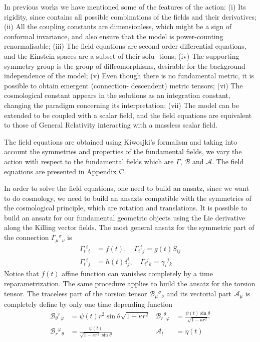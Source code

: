 \documentclass[10pt,a4paper]{article}
\begin{document}
In previous works we have mentioned some of the features of the action: (i) Its rigidity, since contains all possible combinations of the fields and their derivatives; 
(ii) All the coupling constants are dimensionless, which might be a sign of conformal invariance, and also ensure that the model is power-counting renormalisable; 
(iii) The field equations are second order differential equations, and the Einstein spaces are a subset of their solu- tions; 
(iv) The supporting symmetry group is the group of diffeomorphisms, desirable for the background independence of the model; 
(v) Even though there is no fundamental metric, it is possible to obtain emergent (connection- descendent) metric tensors; 
(vi) The cosmological constant appears in the solutions as an integration constant, changing the paradigm concerning its interpretation; 
(vii) The model can be extended to be coupled with a scalar field, and the field equations are equivalent to those of General Relativity interacting with a massless scalar field. 

The field equations are obtained using Kiwosjki’s formalism and taking into account the symmetries and properties of the fundamental fields, 
we vary the action with respect to the fundamental fields which are $\Gamma$, $\mathcal{B}$ and $\mathcal{A}$. The field equations are presented in Appendix C.

In order to solve the field equations, one need to build an ansatz, since we want to do cosmology, we need to build an ansazts
compatible with the symmetries of the cosmological principle, which are rotation and translations. It is possible to build an ansatz for our
fundamental geometric objects using the Lie derivative along the Killing vector fields. The most general ansatz for the symmetric part of the 
connection $\Gamma_{\mu}{}^{\sigma}{}_{\nu}$ is
\begin{align}
      \Gamma_{t}{}^{t}{ }_{t} & =f(t), \quad \Gamma_{i}{ }^{t}{ }_{j}=g(t) S_{i j} \\
      \Gamma_{t}{ }^{i}{ }_{j} &= h(t) \delta^{i}_{j}, \quad \Gamma_{i}{ }^{j}{ }_{k}= \gamma_{i}{ }^{j}{ }_{k}
\end{align}
Notice that $f(t)$ affine function can vanishes completely by a time reparametrization. The same procedure applies to build the ansatz for the torsion tensor. The traceless part of the torsion 
tensor $\mathcal{B}_{\mu}{}^{\sigma}{}_{\nu}$ and its vectorial part $\mathcal{A}_\mu$ is completely define by only one time depending function
\begin{align*}
    \mathcal{B}_{\theta}{ }^{r}{ }_{\varphi} & = \psi (t) r^2\sin\theta \sqrt{1 - \kappa r^2} &
    \mathcal{B}_{r}{}^{\theta}{}_{\varphi} & =\frac{\psi (t) \sin \theta}{\sqrt{1 - \kappa r^2}} \\
    \mathcal{B}_{r}{}^{\varphi}{}_{\theta} & =\frac{\psi(t)}{ \sqrt{1-\kappa r^{2}} \sin \theta} & \mathcal{A}_{t} & = \eta(t)
\end{align*}
\end{document}
